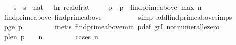 \begin{isabellebody}
\ \ \isamarkupfalse%
\ s\ \ {\isachardoublequoteopen}s\ {\isacharequal}{\kern0pt}\ nat\ {\isasymlceil}{\isacharminus}{\kern0pt}{\isacharparenleft}{\kern0pt}{}{}\ {\isacharasterisk}{\kern0pt}\ ln\ {\isacharparenleft}{\kern0pt}real{\isacharunderscore}{\kern0pt}of{\isacharunderscore}{\kern0pt}rat\ {\isasymepsilon}{\isacharparenright}{\kern0pt}{\isacharparenright}{\kern0pt}{\isasymrceil}{\isachardoublequoteclose}\isanewline
\ \ \isamarkupfalse%
\ p\ \ {\isachardoublequoteopen}p\ {\isacharequal}{\kern0pt}\ find{\isacharunderscore}{\kern0pt}prime{\isacharunderscore}{\kern0pt}above\ {\isacharparenleft}{\kern0pt}max\ n\ {}{\isacharparenright}{\kern0pt}{\isachardoublequoteclose}\isanewline
\isanewline
\ \ \isamarkupfalse%
\ find{\isacharunderscore}{\kern0pt}prime{\isacharunderscore}{\kern0pt}above{\isacharunderscore}{\kern0pt}{}{\isacharcolon}{\kern0pt}\ {\isachardoublequoteopen}find{\isacharunderscore}{\kern0pt}prime{\isacharunderscore}{\kern0pt}above\ {}\ {\isacharequal}{\kern0pt}\ {}{\isachardoublequoteclose}\ \isanewline
\ \ \ \ \isamarkupfalse%
\ {\isacharparenleft}{\kern0pt}simp\ add{\isacharcolon}{\kern0pt}find{\isacharunderscore}{\kern0pt}prime{\isacharunderscore}{\kern0pt}above{\isachardot}{\kern0pt}simps{\isacharparenright}{\kern0pt}\isanewline
\isanewline
\ \ \isamarkupfalse%
\ p{\isacharunderscore}{\kern0pt}ge{\isacharunderscore}{\kern0pt}{}{\isacharcolon}{\kern0pt}\ {\isachardoublequoteopen}p\ {\isachargreater}{\kern0pt}\ {}{\isachardoublequoteclose}\ \isanewline
\ \ \ \ \isamarkupfalse%
\ {\isacharparenleft}{\kern0pt}metis\ find{\isacharunderscore}{\kern0pt}prime{\isacharunderscore}{\kern0pt}above{\isacharunderscore}{\kern0pt}min\ p{\isacharunderscore}{\kern0pt}def\ gr{}I\ not{\isacharunderscore}{\kern0pt}numeral{\isacharunderscore}{\kern0pt}le{\isacharunderscore}{\kern0pt}zero{\isacharparenright}{\kern0pt}\isanewline
\ \ \isamarkupfalse%
\ p{\isacharunderscore}{\kern0pt}le{\isacharunderscore}{\kern0pt}n{\isacharcolon}{\kern0pt}\ {\isachardoublequoteopen}p\ {\isasymle}\ {}\ {\isacharasterisk}{\kern0pt}\ n\ {\isacharplus}{\kern0pt}\ {}{\isachardoublequoteclose}\ \isanewline
\ \ \ \ \isamarkupfalse%
\ {\isacharparenleft}{\kern0pt}cases\ {\isachardoublequoteopen}n\ {\isasymle}\ {}{\isachardoublequoteclose}{\isacharparenright}{\kern0pt}\isanewline

\end{isabellebody}
